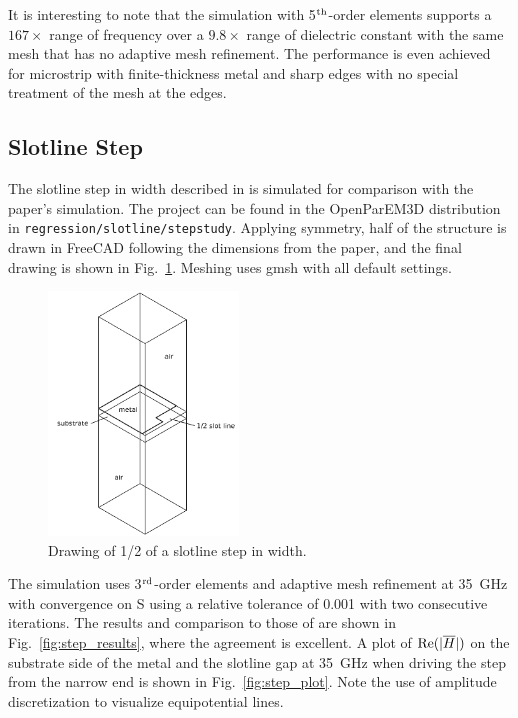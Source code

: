 \documentclass[titlepage]{article}
\renewcommand\_{\textunderscore\linebreak[1]}
\begin{document}
It is interesting to note that the simulation with  5$^{\textnormal{th}}$-order elements supports a $167\times$ range of frequency over a $9.8\times$ range of dielectric constant with the same mesh that has no adaptive mesh refinement.  The performance is even achieved for microstrip with finite-thickness metal and sharp edges with no special treatment of the mesh at the edges.

\subsection{Slotline Step}

The slotline step in width described in \cite{Hirayama} is simulated for comparison with the paper's simulation.  The project can be found in the OpenParEM3D distribution in \texttt{regression/slotline/step\_study}.  Applying symmetry, half of the structure is drawn in FreeCAD following the dimensions from the paper, and the final drawing is shown in Fig.~\ref{fig:step_drawing}.  Meshing uses gmsh with all default settings.

\begin{figure}[H]
  \centering
  \includegraphics[width=0.45\textwidth]{../regression/OpenParEM3D/slotline/step_study/screenshots/step_drawing}
  \caption{Drawing of 1/2 of a slotline step in width.}
  \label{fig:step_drawing}
\end{figure}

The simulation uses 3$^{\textnormal{rd}}$-order elements and adaptive mesh refinement at 35~GHz with convergence on S using a relative tolerance of 0.001 with two consecutive iterations.  The results and comparison to those of \cite{Hirayama} are shown in Fig.~\ref{fig:step_results}, where the agreement is excellent.  A plot of $\textnormal{Re}(|\overline{H}|)$ on the substrate side of the metal and the slotline gap at 35~GHz when driving the step from the narrow end is shown in Fig.~\ref{fig:step_plot}.  Note the use of amplitude discretization to visualize equipotential lines.
\end{document}
